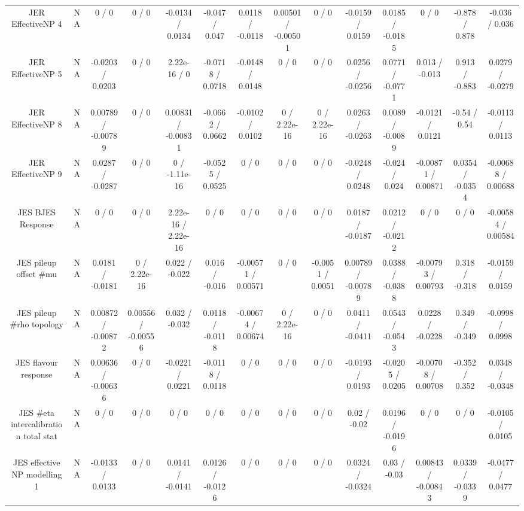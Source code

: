 \documentclass[10pt]{article}
\begin{document}
\begin{table}[htbp]
\begin{center}
\begin{tabular}{|c|c|c|c|c|c|c|c|c|c|c|c|c|c|}
  JER EffectiveNP 4 &    NA    & 0 / 0 & 0 / 0 & -0.0134 / 0.0134 & -0.047 / 0.047 & 0.0118 / -0.0118 & 0.00501 / -0.00501 & 0 / 0 & -0.0159 / 0.0159 & 0.0185 / -0.0185 & 0 / 0 & -0.878 / 0.878 & -0.036 / 0.036 \\ 
  JER EffectiveNP 5 &    NA    & -0.0203 / 0.0203 & 0 / 0 & 2.22e-16 / 0 & -0.0718 / 0.0718 & -0.0148 / 0.0148 & 0 / 0 & 0 / 0 & 0.0256 / -0.0256 & 0.0771 / -0.0771 & 0.013 / -0.013 & 0.913 / -0.883 & 0.0279 / -0.0279 \\ 
  JER EffectiveNP 8 &    NA    & 0.00789 / -0.00789 & 0 / 0 & 0.00831 / -0.00831 & -0.0662 / 0.0662 & -0.0102 / 0.0102 & 0 / 2.22e-16 & 0 / 2.22e-16 & 0.0263 / -0.0263 & 0.0089 / -0.0089 & -0.0121 / 0.0121 & -0.54 / 0.54 & -0.0113 / 0.0113 \\ 
  JER EffectiveNP 9 &    NA    & 0.0287 / -0.0287 & 0 / 0 & 0 / -1.11e-16 & -0.0525 / 0.0525 & 0 / 0 & 0 / 0 & 0 / 0 & -0.0248 / 0.0248 & -0.024 / 0.024 & -0.00871 / 0.00871 & 0.0354 / -0.0354 & -0.00688 / 0.00688 \\ 
  JES BJES Response &    NA    & 0 / 0 & 0 / 0 & 2.22e-16 / 2.22e-16 & 0 / 0 & 0 / 0 & 0 / 0 & 0 / 0 & 0.0187 / -0.0187 & 0.0212 / -0.0212 & 0 / 0 & 0 / 0 & -0.00584 / 0.00584 \\ 
  JES pileup offset #mu &    NA    & 0.0181 / -0.0181 & 0 / 2.22e-16 & 0.022 / -0.022 & 0.016 / -0.016 & -0.00571 / 0.00571 & 0 / 0 & -0.0051 / 0.0051 & 0.00789 / -0.00789 & 0.0388 / -0.0388 & -0.00793 / 0.00793 & 0.318 / -0.318 & -0.0159 / 0.0159 \\ 
  JES pileup #rho topology &    NA    & 0.00872 / -0.00872 & 0.00556 / -0.00556 & 0.032 / -0.032 & 0.0118 / -0.0118 & -0.00674 / 0.00674 & 0 / 2.22e-16 & 0 / 0 & 0.0411 / -0.0411 & 0.0543 / -0.0543 & 0.0228 / -0.0228 & 0.349 / -0.349 & -0.0998 / 0.0998 \\ 
  JES flavour response &    NA    & 0.00636 / -0.00636 & 0 / 0 & -0.0221 / 0.0221 & -0.0118 / 0.0118 & 0 / 0 & 0 / 0 & 0 / 0 & -0.0193 / 0.0193 & -0.0205 / 0.0205 & -0.00708 / 0.00708 & -0.352 / 0.352 & 0.0348 / -0.0348 \\ 
  JES #eta intercalibration total stat &    NA    & 0 / 0 & 0 / 0 & 0 / 0 & 0 / 0 & 0 / 0 & 0 / 0 & 0 / 0 & 0.02 / -0.02 & 0.0196 / -0.0196 & 0 / 0 & 0 / 0 & -0.0105 / 0.0105 \\ 
  JES effective NP modelling 1 &    NA    & -0.0133 / 0.0133 & 0 / 0 & 0.0141 / -0.0141 & 0.0126 / -0.0126 & 0 / 0 & 0 / 0 & 0 / 0 & 0.0324 / -0.0324 & 0.03 / -0.03 & 0.00843 / -0.00843 & 0.0339 / -0.0339 & -0.0477 / 0.0477 \\ 

\end{tabular}
\end{center}
\end{table}
\end{document}

